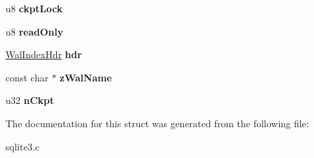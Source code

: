 \begin{DoxyCompactItemize}
\item 
\hypertarget{struct_wal_a29153bfb37a9a32f1171e5c1d10994d2}{u8 {\bfseries ckpt\-Lock}}\label{struct_wal_a29153bfb37a9a32f1171e5c1d10994d2}

\item 
\hypertarget{struct_wal_a38f0810e34bdc89acdf27574473c0495}{u8 {\bfseries read\-Only}}\label{struct_wal_a38f0810e34bdc89acdf27574473c0495}

\item 
\hypertarget{struct_wal_adbeef9e632541fbf07c926652b165906}{\hyperlink{struct_wal_index_hdr}{Wal\-Index\-Hdr} {\bfseries hdr}}\label{struct_wal_adbeef9e632541fbf07c926652b165906}

\item 
\hypertarget{struct_wal_ac54961758701702d67eaf3ce15c69ea5}{const char $\ast$ {\bfseries z\-Wal\-Name}}\label{struct_wal_ac54961758701702d67eaf3ce15c69ea5}

\item 
\hypertarget{struct_wal_a8fbe9b014342db76d8167b518b70acad}{u32 {\bfseries n\-Ckpt}}\label{struct_wal_a8fbe9b014342db76d8167b518b70acad}

\end{DoxyCompactItemize}


The documentation for this struct was generated from the following file\-:\begin{DoxyCompactItemize}
\item 
sqlite3.\-c\end{DoxyCompactItemize}
